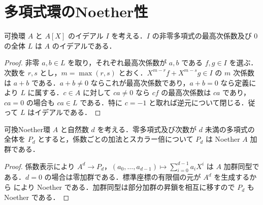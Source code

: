 \section{多項式環のNoether性}
\begin{prop}[最高次係数のイデアル]
可換環 $A$ と $A[X]$ のイデアル $I$ を考える．$I$ の非零多項式の最高次係数及び $0$ の全体 $L$ は $A$ のイデアルである．
\end{prop}
\begin{proof}
非零 $a,b\in L$ を取り，それぞれ最高次係数が $a,b$ である $f,g\in I$ を選ぶ．次数を $r,s$ とし，$m=\max(r,s)$ とおく．$X^{m-r}f+X^{m-s}g\in I$ の $m$ 次係数は $a+b$ である．$a+b\ne0$ ならこれが最高次係数であり，$a+b=0$ なら定義により $L$ に属する．$c\in A$ に対して $ca\ne0$ なら $cf$ の最高次係数は $ca$ であり，$ca=0$ の場合も $ca\in L$ である．特に $c=-1$ と取れば逆元について閉じる．従って $L$ はイデアルである．
\end{proof}
\begin{prop}[有界次数多項式の加群]
可換Noether環 $A$ と自然数 $d$ を考える．零多項式及び次数が $d$ 未満の多項式の全体を $P_d$ とすると，係数ごとの加法とスカラー倍について $P_d$ は Noether $A$ 加群である．
\end{prop}
\begin{proof}
係数表示により $A^d\to P_d$，$(a_0,\ldots,a_{d-1})\mapsto\sum_{i=0}^{d-1}a_iX^i$ は $A$ 加群同型である．$d=0$ の場合は零加群である．標準座標の有限個の元が $A^d$ を生成するから により Noether である．加群同型は部分加群の昇鎖を相互に移すので $P_d$ も Noether である．
\end{proof}
